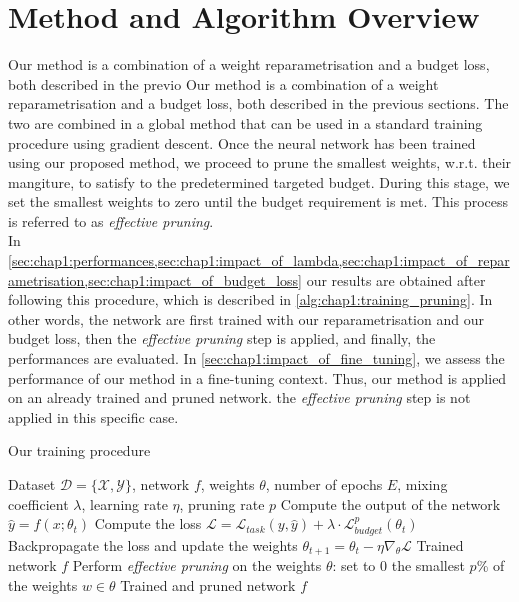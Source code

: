 
\section{Method and Algorithm Overview}
\label{sec:chap1:overview}
Our method is a combination of a weight reparametrisation and a budget loss,
both described in the previo Our method is a combination of a weight
reparametrisation and a budget loss, both described in the previous sections.
The two are combined in a global method that can be used in a standard training
procedure using gradient descent. Once the neural network has been trained using
our proposed method, we proceed to prune the smallest weights, w.r.t. their
mangiture, to satisfy to the predetermined targeted budget. During this stage,
we set the smallest weights to zero until the budget requirement is met. This
process is referred to as \textit{effective pruning}.\\

In
\cref{sec:chap1:performances,sec:chap1:impact_of_lambda,sec:chap1:impact_of_reparametrisation,sec:chap1:impact_of_budget_loss}
our results are obtained after following this procedure, which is described in
\cref{alg:chap1:training_pruning}. In other words, the network are first trained
with our reparametrisation and our budget loss, then the \textit{effective
pruning} step is applied, and finally, the performances are evaluated. In
\cref{sec:chap1:impact_of_fine_tuning}, we  assess the performance of our method
in a fine-tuning context. Thus, our method is applied on an already trained and
pruned network. the \emph{effective pruning} step is not applied in this
specific case.\\

\begin{algorithm}
  \caption{Our training procedure}
  \label{alg:chap1:training_pruning}
  \begin{algorithmic}
  \REQUIRE Dataset $\mathcal{D} = \{\mathcal{X}, \mathcal{Y}\}$, network $f$,
  weights $\theta$, number of epochs $E$, mixing coefficient $\lambda$, learning
  rate $\eta$, pruning rate $p$
          \STATE Compute the output of the network $\hat{y} = f(x; \theta_t)$
          \STATE Compute the loss $\mathcal{L}= \mathcal{L}_{task}(y, \hat{y}) + \lambda \cdot \mathcal{L}^{p}_{budget}(\theta_t)$
          \STATE Backpropagate the loss and update the weights $\theta_{t+1} = \theta_t - \eta \nabla_{\theta} \mathcal{L}$
      \ENDFOR
  \ENDFOR
  \RETURN Trained network $f$
  \STATE Perform \emph{effective pruning} on the weights $\theta$: set to 0 the
  smallest $p$\% of the weights $w\in\theta$
  \RETURN Trained and pruned network $f$
  \end{algorithmic}
  \end{algorithm}


